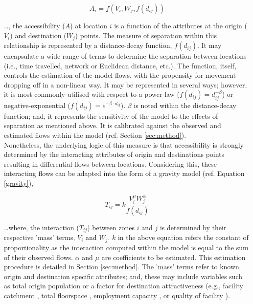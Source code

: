 \begin{equation}
\label{eqn:hansen_generalised}
    A_{i} = f(V_{i}, W_{j}, f(d_{ij}))
\end{equation}

\ldots, the accessibility ($A$) at location $i$ is a function of the attributes at the origin ($V_{i}$) and destination ($W_{j}$) points. The measure of separation within this relationship is represented by a distance-decay function, $f(d_{ij})$. It may encapsulate a wide range of terms to determine the separation between locations (i.e., time travelled, network or Euclidean distance, etc.). The function, itself, controls the estimation of the model flows, with the propensity for movement dropping off in a non-linear way. It may be represented in several ways; however, it is most commonly utilised with respect to a power-law ($f(d_{ij}) = d^{-\beta}_{ij}$) or negative-exponential ($f(d_{ij}) = e^{-\beta \cdot d_{ij}}$). $\beta$ is noted within the distance-decay function; and, it represents the sensitivity of the model to the effects of separation as mentioned above. It is calibrated against the observed and estimated flows within the model (ref. Section \ref{sec:method}).\\

Nonetheless, the underlying logic of this measure is that accessibility is strongly determined by the interacting attributes of origin and destinations points resulting in differential flows between locations. Considering this, these interacting flows can be adapted into the form of a gravity model (ref. Equation \ref{gravity}), 

\begin{equation}
\label{gravity}
T_{ij} = k\frac{V_{i}^{\mu} W_{j}^{\alpha}}{f(d_{ij})}
\end{equation}

\ldots where, the interaction ($T_{ij}$) between zones $i$ and $j$ is determined by their respective 'mass' terms, $V_{i}$ and $W_{j}$. $k$ in the above equation refers the constant of proportionality as the interaction computed within the model is equal to the sum of their observed flows. $\alpha$ and $\mu$ are coefficients to be estimated. This estimation procedure is detailed in Section \ref{sec:method}. The 'mass' terms refer to known origin and destination specific attributes; and, these may include variables such as total origin population or a factor for destination attractiveness (e.g., facility catchment \citep{luo2014integrating}, total floorspace \citep{piovani2018measuring}, employment capacity \citep{kantorovich1992equilibrium, hernandez2006information}, or quality of facility \citep{geurs2015recent}).\\

